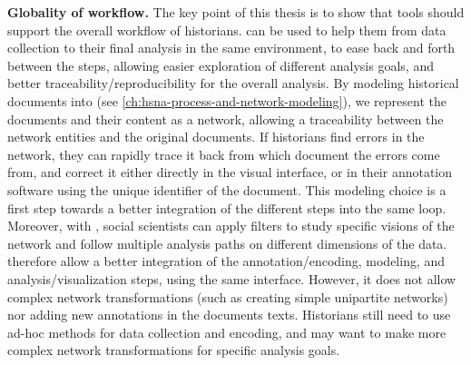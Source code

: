 \noindent\textbf{Globality of \hsna workflow.} The key point of this thesis is to show that \va tools should support the overall \hsna workflow of historians.
\va can be used to help them from data collection to their final analysis in the same environment, to ease back and forth between the steps, allowing easier exploration of different analysis goals, and better traceability/reproducibility for the overall analysis.
By modeling historical documents into \modelplural (see \autoref{ch:hsna-process-and-network-modeling}), we represent the documents and their content as a network, allowing a traceability between the network entities and the original documents.
If historians find errors in the network, they can rapidly trace it back from which document the errors come from, and correct it either directly in the visual interface, or in their annotation software using the unique identifier of the document.
This modeling choice is a first step towards a better integration of the different steps into the same \va loop.
Moreover, with \combinet, social scientists can apply filters to study specific visions of the network and follow multiple analysis paths on different dimensions of the data.
\name therefore allow a better integration of the annotation/encoding, modeling, and analysis/visualization steps, using the same interface.
However, it does not allow complex network transformations (such as creating simple unipartite networks) nor adding new annotations in the documents texts.
Historians still need to use ad-hoc methods for data collection and encoding, and may want to make more complex network transformations for specific analysis goals.







